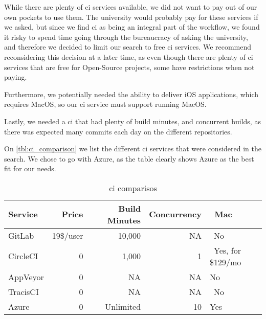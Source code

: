 While there are plenty of \gls{ci} services available, we did not want to pay out of our own pockets to use them. The university would probably pay for these services if we asked, but since we find \gls{ci} as being an integral part of the workflow, we found it risky to spend time going through the bureaucracy of asking the university, and therefore we decided to limit our search to free \gls{ci} services. We recommend reconsidering this decision at a later time, as even though there are plenty of \gls{ci} services that are free for Open-Source projects, some have restrictions when not paying.

Furthermore, we potentially needed the ability to deliver iOS applications, which requires MacOS, so our \gls{ci} service must support running MacOS. 

Lastly, we needed a \gls{ci} that had plenty of build minutes, and concurrent builds, as there was expected many commits each day on the different repositories.

On \autoref{tbl:ci_comparison} we list the different \gls{ci} services that were considered in the search. We chose to go with Azure, as the table clearly shows Azure as the best fit for our needs.

\noindent\begin{longtable}[]{@{}lrrrl@{}}
    \caption{\gls{ci} comparisos}
    \label{tbl:ci_comparison}\\
    \toprule
    Service & Price & ~Build Minutes & Concurrency & ~Mac\tabularnewline
    \midrule
    \endhead
    GitLab & 19\$/user & 10,000 & NA & ~No\tabularnewline
    CircleCI & 0 & 1,000 & 1 & ~Yes, for \$129/mo\tabularnewline
    AppVeyor & 0 & ~ NA & NA & No\tabularnewline
    TracisCI & ~ 0 & ~ NA & ~ NA & ~No ~\tabularnewline
    Azure & 0 & ~ Unlimited & ~10 & Yes\tabularnewline
    \bottomrule
\end{longtable}
